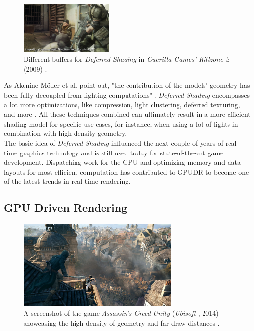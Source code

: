 \begin{figure}[!]
    \includegraphics[width=175px]{images/graphics/killzone-2-buffer-post.jpg}
    \caption{Different buffers for \emph{Deferred Shading} in \emph{Guerilla Games'} \emph{Killzone 2} (2009) 
    \cite{Valient2007}.}
    \label{fig:deferred-shading-buffers}
\end{figure}

\noindent
As Akenine-Möller et al. point out, "the contribution of the models’ geometry has been fully decoupled from lighting 
computations" \cite{AkenineMoeller2018}. \emph{Deferred Shading} encompasses a lot more optimizations, like compression, 
light clustering, deferred texturing, and more \cite{AkenineMoeller2018}. All these techniques combined can ultimately 
result in a more efficient shading model for specific use cases, for instance, when using a lot of lights in combination 
with high density geometry.\\

\noindent
The basic idea of \emph{Deferred Shading} influenced the next couple of years of real-time graphics technology and is 
still used today for state-of-the-art game development. Dispatching work for the \ac{GPU} and optimizing memory and 
data layouts for most efficient computation has contributed to \ac{GPUDR} to become one of the latest trends in real-time 
rendering.

\subsection*{GPU Driven Rendering}

\begin{figure}[h]
    \centering
    \includegraphics[width=300px]{images/graphics/assassins-creed-unity-gameplay.jpg}
    \caption{A screenshot of the game \emph{Assassin's Creed Unity} (\emph{Ubisoft} \cite{Ubisoft2014}, 2014) 
    showcasing the high density of geometry and far draw distances \cite{Burke2014}.}
    \label{fig:assassins-creed-unity-gameplay}
\end{figure}

